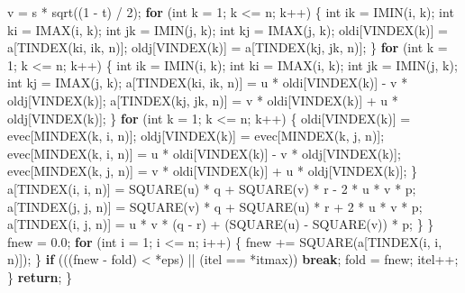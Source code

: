\documentclass[12pt,]{article}
\newenvironment{Shaded}{\begin{snugshade}}{\end{snugshade}}
\newcommand{\DataTypeTok}[1]{\textcolor[rgb]{0.13,0.29,0.53}{#1}}
\newcommand{\DecValTok}[1]{\textcolor[rgb]{0.00,0.00,0.81}{#1}}
\newcommand{\FloatTok}[1]{\textcolor[rgb]{0.00,0.00,0.81}{#1}}
\newcommand{\ControlFlowTok}[1]{\textcolor[rgb]{0.13,0.29,0.53}{\textbf{#1}}}
\newcommand{\NormalTok}[1]{#1}
\begin{document}
\begin{Shaded}
\begin{Highlighting}[]
\NormalTok{                v = s * sqrt((}\DecValTok{1}\NormalTok{ - t) / }\DecValTok{2}\NormalTok{);}
                \ControlFlowTok{for}\NormalTok{ (}\DataTypeTok{int}\NormalTok{ k = }\DecValTok{1}\NormalTok{; k <= n; k++) \{}
                    \DataTypeTok{int}\NormalTok{ ik = IMIN(i, k);}
                    \DataTypeTok{int}\NormalTok{ ki = IMAX(i, k);}
                    \DataTypeTok{int}\NormalTok{ jk = IMIN(j, k);}
                    \DataTypeTok{int}\NormalTok{ kj = IMAX(j, k);}
\NormalTok{                    oldi[VINDEX(k)] = a[TINDEX(ki, ik, n)];}
\NormalTok{                    oldj[VINDEX(k)] = a[TINDEX(kj, jk, n)];}
\NormalTok{                \}}
                \ControlFlowTok{for}\NormalTok{ (}\DataTypeTok{int}\NormalTok{ k = }\DecValTok{1}\NormalTok{; k <= n; k++) \{}
                    \DataTypeTok{int}\NormalTok{ ik = IMIN(i, k);}
                    \DataTypeTok{int}\NormalTok{ ki = IMAX(i, k);}
                    \DataTypeTok{int}\NormalTok{ jk = IMIN(j, k);}
                    \DataTypeTok{int}\NormalTok{ kj = IMAX(j, k);}
\NormalTok{                    a[TINDEX(ki, ik, n)] =}
\NormalTok{                        u * oldi[VINDEX(k)] - v * oldj[VINDEX(k)];}
\NormalTok{                    a[TINDEX(kj, jk, n)] =}
\NormalTok{                        v * oldi[VINDEX(k)] + u * oldj[VINDEX(k)];}
\NormalTok{                \}}
                \ControlFlowTok{for}\NormalTok{ (}\DataTypeTok{int}\NormalTok{ k = }\DecValTok{1}\NormalTok{; k <= n; k++) \{}
\NormalTok{                    oldi[VINDEX(k)] = evec[MINDEX(k, i, n)];}
\NormalTok{                    oldj[VINDEX(k)] = evec[MINDEX(k, j, n)];}
\NormalTok{                    evec[MINDEX(k, i, n)] =}
\NormalTok{                        u * oldi[VINDEX(k)] - v * oldj[VINDEX(k)];}
\NormalTok{                    evec[MINDEX(k, j, n)] =}
\NormalTok{                        v * oldi[VINDEX(k)] + u * oldj[VINDEX(k)];}
\NormalTok{                \}}
\NormalTok{                a[TINDEX(i, i, n)] =}
\NormalTok{                    SQUARE(u) * q + SQUARE(v) * r - }\DecValTok{2}\NormalTok{ * u * v * p;}
\NormalTok{                a[TINDEX(j, j, n)] =}
\NormalTok{                    SQUARE(v) * q + SQUARE(u) * r + }\DecValTok{2}\NormalTok{ * u * v * p;}
\NormalTok{                a[TINDEX(i, j, n)] =}
\NormalTok{                    u * v * (q - r) + (SQUARE(u) - SQUARE(v)) * p;}
\NormalTok{            \}}
\NormalTok{        \}}
\NormalTok{        fnew = }\FloatTok{0.0}\NormalTok{;}
        \ControlFlowTok{for}\NormalTok{ (}\DataTypeTok{int}\NormalTok{ i = }\DecValTok{1}\NormalTok{; i <= n; i++) \{}
\NormalTok{            fnew += SQUARE(a[TINDEX(i, i, n)]);}
\NormalTok{        \}}
        \ControlFlowTok{if}\NormalTok{ (((fnew - fold) < *eps) || (itel == *itmax)) }\ControlFlowTok{break}\NormalTok{;}
\NormalTok{        fold = fnew;}
\NormalTok{        itel++;}
\NormalTok{    \}}
    \ControlFlowTok{return}\NormalTok{;}
\NormalTok{\}}


\end{Highlighting}
\end{Shaded}
\end{document}
